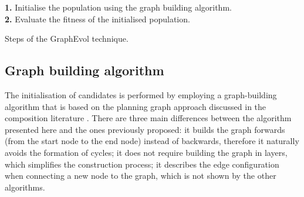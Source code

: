 \documentclass{article}
\begin{document}
\begin{algorithm}
 \setlength{}
 \let\oldnl\nl%
\newcommand{\nonl}{\renewcommand{\nl}{\let\nl\oldnl}}
 \LinesNumbered
	\textbf{1.} Initialise the population using the graph building algorithm.\\
	\textbf{2.} Evaluate the fitness of the initialised population.\\
	\nonl {}
 \caption{\footnotesize Steps of the GraphEvol technique.}
\label{graphEvolSteps}
\end{algorithm}

\subsection{Graph building algorithm}

The initialisation of candidates is performed by employing a graph-building algorithm that is based on
the planning graph approach discussed in the composition literature \cite{huang2009effective,deng2013efficient,wang2013genetic,chen2014qos}.
There are three main differences between the algorithm presented here and the ones previously proposed: it builds the graph forwards (from the start
node to the end node) instead of backwards, therefore it naturally avoids the formation of cycles; it does not require building the graph in layers,
which simplifies the construction process; it describes the edge configuration when connecting a new node to the graph, which is not shown
by the other algorithms.

\end{document}
